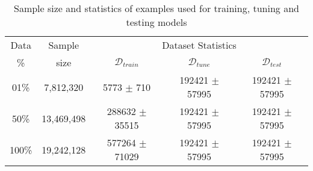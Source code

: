 \begin{table}[ht!]
\caption{Sample size and statistics of examples used for training, tuning and testing models}
\label{tab:size_stats}
\begin{tabular}{c|c|ccc}
\toprule
Data & Sample & \multicolumn{3}{c}{Dataset Statistics} \\
\cmidrule(lr){3-5}
\% & size & $\mathcal{D}_{train}$ & $\mathcal{D}_{tune}$ & $\mathcal{D}_{test}$ \\
\midrule
01\% & 7,812,320 & 5773 $\pm$ 710 & 192421 $\pm$ 57995 & 192421 $\pm$ 57995 \\
50\% & 13,469,498 & 288632 $\pm$ 35515 & 192421 $\pm$ 57995 & 192421 $\pm$ 57995 \\
100\% & 19,242,128 & 577264 $\pm$ 71029 & 192421 $\pm$ 57995 & 192421 $\pm$ 57995 \\
\bottomrule
\end{tabular}
\end{table}